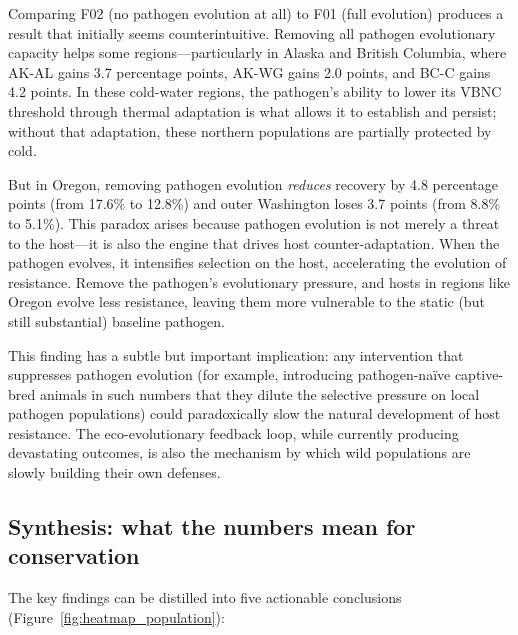 Comparing F02 (no pathogen evolution at all) to F01 (full evolution) produces
a result that initially seems counterintuitive. Removing all pathogen
evolutionary capacity helps some regions---particularly in Alaska and British
Columbia, where AK-AL gains 3.7 percentage points, AK-WG gains 2.0 points,
and BC-C gains 4.2 points. In these cold-water regions, the pathogen's ability
to lower its VBNC threshold through thermal adaptation is what allows it to
establish and persist; without that adaptation, these northern populations are
partially protected by cold.

But in Oregon, removing pathogen evolution \textit{reduces} recovery by 4.8
percentage points (from 17.6\% to 12.8\%) and outer Washington loses 3.7
points (from 8.8\% to 5.1\%). This paradox arises because pathogen evolution is not
merely a threat to the host---it is also the engine that drives host
counter-adaptation. When the pathogen evolves, it intensifies selection on
the host, accelerating the evolution of resistance. Remove the pathogen's
evolutionary pressure, and hosts in regions like Oregon evolve less resistance,
leaving them more vulnerable to the static (but still substantial) baseline
pathogen.

This finding has a subtle but important implication: any intervention that
suppresses pathogen evolution (for example, introducing pathogen-na\"ive
captive-bred animals in such numbers that they dilute the selective pressure
on local pathogen populations) could paradoxically slow the natural
development of host resistance. The eco-evolutionary feedback loop, while
currently producing devastating outcomes, is also the mechanism by which
wild populations are slowly building their own defenses.

\subsection{Synthesis: what the numbers mean for conservation}
\label{sec:findings_synthesis}

The key findings can be distilled into five actionable conclusions
(Figure~\ref{fig:heatmap_population}):

